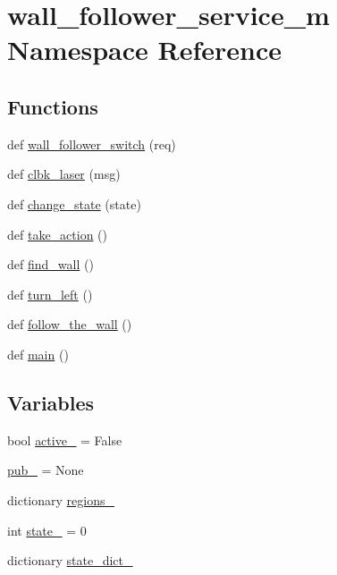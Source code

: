 \hypertarget{namespacewall__follower__service__m}{}\section{wall\+\_\+follower\+\_\+service\+\_\+m Namespace Reference}
\label{namespacewall__follower__service__m}
\subsection*{Functions}
\begin{DoxyCompactItemize}
\item 
def \hyperlink{namespacewall__follower__service__m_ae9e8abfd4154d378ce74492e3c6b8c25}{wall\+\_\+follower\+\_\+switch} (req)
\item 
def \hyperlink{namespacewall__follower__service__m_a49082932764481e168f6f3650664475c}{clbk\+\_\+laser} (msg)
\item 
def \hyperlink{namespacewall__follower__service__m_a74fa42cce94631ffe9d3f64db90d8e42}{change\+\_\+state} (state)
\item 
def \hyperlink{namespacewall__follower__service__m_a427f4720f3202355a1436b58a8faf321}{take\+\_\+action} ()
\item 
def \hyperlink{namespacewall__follower__service__m_a5ce8530e86802800bbcb8bc5a2ec49ad}{find\+\_\+wall} ()
\item 
def \hyperlink{namespacewall__follower__service__m_a384300aaec5867ae87559250968cc4ff}{turn\+\_\+left} ()
\item 
def \hyperlink{namespacewall__follower__service__m_af114875285df80b5b86d958563d9da7c}{follow\+\_\+the\+\_\+wall} ()
\item 
def \hyperlink{namespacewall__follower__service__m_a31efe8a16c4f9f8ade6f60f0b7f5a1c9}{main} ()
\end{DoxyCompactItemize}
\subsection*{Variables}
\begin{DoxyCompactItemize}
\item 
bool \hyperlink{namespacewall__follower__service__m_a3808a035405c1350e8af8bf26e364509}{active\+\_\+} = False
\item 
\hyperlink{namespacewall__follower__service__m_aa92f44d061ddf4a546602a287ea64d11}{pub\+\_\+} = None
\item 
dictionary \hyperlink{namespacewall__follower__service__m_a326b63f9d570893bead600e2b51cf3a9}{regions\+\_\+}
\item 
int \hyperlink{namespacewall__follower__service__m_abc963136b4d1de74889fcb2c0ab2bf34}{state\+\_\+} = 0
\item 
dictionary \hyperlink{namespacewall__follower__service__m_a6f7fc10e2a6a622e5c561a2b13b87acf}{state\+\_\+dict\+\_\+}
\end{DoxyCompactItemize}


